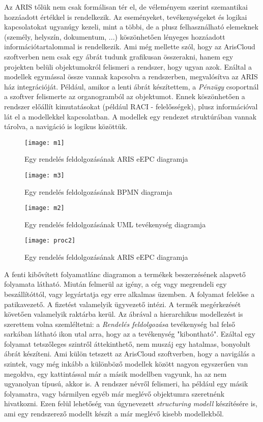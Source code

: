\documentclass[12pt]{article}
\begin{document}
Az ARIS tőlük nem csak formálisan tér el, de véleményem szerint szemantikai hozzáadott értékkel is rendelkezik. Az eseményeket, tevékenységeket és logikai kapcsolatokat ugyanúgy kezeli, mint a többi, de a plusz felhasználható elemeknek (személy, helyszín, dokumentum, ...) köszönhetően lényeges hozzáadott információtartalommal is rendelkezik. Ami még mellette szól, hogy az ArisCloud szoftverben nem csak egy ábrát tudunk grafikusan összerakni, hanem egy projekten belüli objektumokról felismeri a rendszer, hogy ugyan azok. Ezáltal a modellek egymással össze vannak kapcsolva a rendszerben, megvalósítva az ARIS ház integrációját. Például, amikor a lenti ábrát készítettem, a \textit{Pénzügy} csoportnál a szoftver felismerte az organogramból az objektumot. Ennek köszönhetően a rendszer előállít kimutatásokat (például RACI - felelősségek), plusz információval lát el a modellekkel kapcsolatban. A modellek egy rendezet struktúrában vannak tárolva, a navigáció is logikus közöttük.

\begin{figure}
\centering
\texttt{[image: m1]}
\caption{Egy rendelés feldolgozásának ARIS eEPC diagramja}
\end{figure}

\begin{figure}
\texttt{[image: m3]}
\caption{Egy rendelés feldolgozásának BPMN diagramja}
\end{figure}

\begin{figure}
\texttt{[image: m2]}
\caption{Egy rendelés feldolgozásának UML tevékenység diagramja}
\end{figure}

\newpage
\begin{figure}
\texttt{[image: proc2]}
\caption{Egy rendelés feldolgozásának ARIS eEPC diagramja}
\end{figure}
A fenti kibővített folyamatlánc diagramon a termékek beszerzésének alapvető folyamata látható. Miután felmerül az igény, a cég vagy megrendeli egy beszállítóttól, vagy legyártatja egy erre alkalmas üzemben. A folyamat felelőse a patikavezető. A fizetést valamelyik ügyvezető intézi. A termék megérkezését követően valamelyik raktárba kerül. Az ábrával a hierarchikus modellezést is szerettem volna szemléltetni: a \textit{Rendelés feldolgozása} tevékenység bal felső sarkában látható ikon utal arra, hogy az a tevékenység "kibontható". Ezáltal egy folyamat tetszőleges szintről áttekinthető, nem muszáj egy hatalmas, bonyolult ábrát készíteni. Ami külön tetszett az ArisCloud szoftverben, hogy a navigálás a szintek, vagy még inkább a különböző modellek között nagyon egyszerűen van megoldva, egy kattintással már a másik modellben vagyunk, ha az nem ugyanolyan típusú, akkor is. A rendszer névről felismeri, ha például egy másik folyamatra, vagy bármilyen egyéb már meglévő objektumra szeretnénk hivatkozni. Ezen felül lehetőség van úgynevezett \textit{structuring modell} készítésére is, ami egy rendszerező modellt készít a már meglévő kisebb modellekből.
\end{document}
